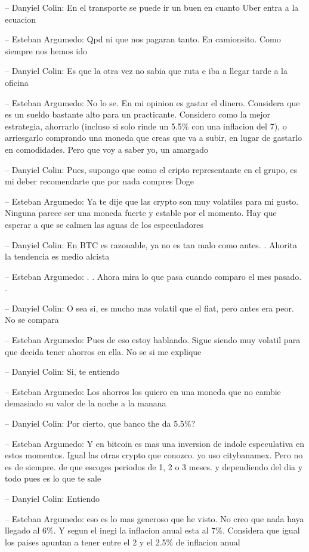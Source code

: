 -- Danyiel Colin: En el transporte se puede ir un buen en cuanto Uber
entra a la ecuacion

-- Esteban Argumedo: Qpd ni que nos pagaran tanto. En camionsito. Como
siempre nos hemos ido

-- Danyiel Colin: Es que la otra vez no sabia que ruta e iba a llegar
tarde a la oficina

-- Esteban Argumedo: No lo se. En mi opinion es gastar el dinero.
Considera que es un sueldo bastante alto para un practicante. Considero
como la mejor estrategia, ahorrarlo (incluso si solo rinde un 5.5\% con
una inflacion del 7), o arriesgarlo comprando una moneda que creas que
va a subir, en lugar de gastarlo en comodidades. Pero que voy a saber
yo, un amargado

-- Danyiel Colin: Pues, supongo que como el cripto representante en el
grupo, es mi deber recomendarte que por nada compres Doge

-- Esteban Argumedo: Ya te dije que las crypto son muy volatiles para mi
gusto. Ninguna parece ser una moneda fuerte y estable por el momento.
Hay que esperar a que se calmen las aguas de los especuladores

-- Danyiel Colin: En BTC es razonable, ya no es tan malo como antes. .
Ahorita la tendencia es medio alcista

-- Esteban Argumedo: . . Ahora mira lo que pasa cuando comparo el mes
pasado. .

-- Danyiel Colin: O sea si, es mucho mas volatil que el fiat, pero antes
era peor. No se compara

-- Esteban Argumedo: Pues de eso estoy hablando. Sigue siendo muy
volatil para que decida tener ahorros en ella. No se si me explique

-- Danyiel Colin: Si, te entiendo

-- Esteban Argumedo: Los ahorros los quiero en una moneda que no cambie
demasiado su valor de la noche a la manana

-- Danyiel Colin: Por cierto, que banco the da 5.5\%?

-- Esteban Argumedo: Y en bitcoin es mas una inversion de indole
especulativa en estos momentos. Igual las otras crypto que conozco. yo
uso citybanamex. Pero no es de siempre. de que escoges periodos de 1, 2
o 3 meses. y dependiendo del dia y todo pues es lo que te sale

-- Danyiel Colin: Entiendo

-- Esteban Argumedo: eso es lo mas generoso que he visto. No creo que
nada haya llegado al 6\%. Y segun el inegi la inflacion anual esta al
7\%. Considera que igual los paises apuntan a tener entre el 2 y el
2.5\% de inflacion anual

